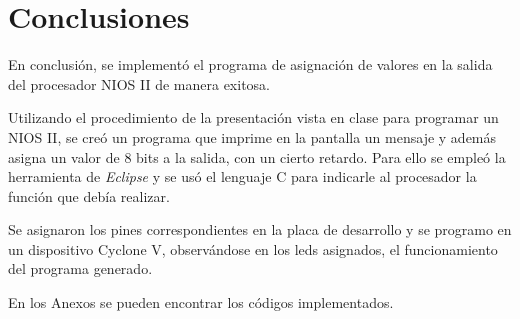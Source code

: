 \section{Conclusiones}
En conclusión, se implementó el programa de asignación de valores en la salida del procesador NIOS II de manera exitosa.

Utilizando el procedimiento de la presentación vista en clase para programar un NIOS II, se creó un programa que imprime en la pantalla un mensaje y además asigna un valor de 8 bits a la salida, con un cierto retardo. Para ello se empleó la herramienta de \textit{Eclipse} y se usó el lenguaje C para indicarle al procesador la función que debía realizar. 

Se asignaron los pines correspondientes en la placa de desarrollo y se programo en un dispositivo Cyclone V, observándose en los leds asignados, el funcionamiento del programa generado.

En los Anexos se pueden encontrar los códigos implementados.